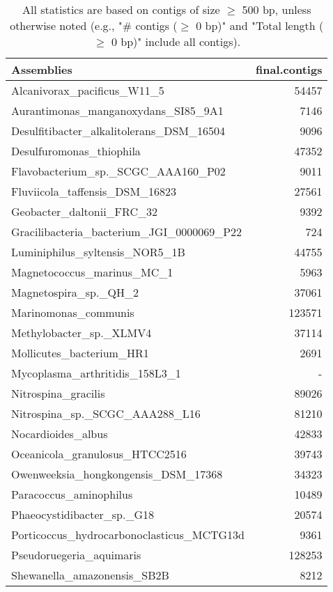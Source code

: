 \documentclass[12pt,a4paper]{article}
\begin{document}
\begin{table}[ht]
\begin{center}
\caption{All statistics are based on contigs of size $\geq$ 500 bp, unless otherwise noted (e.g., "\# contigs ($\geq$ 0 bp)" and "Total length ($\geq$ 0 bp)" include all contigs).}
\begin{tabular}{|l*{1}{|r}|}
\hline
Assemblies & final.contigs \\ \hline
Alcanivorax\_pacificus\_W11\_5 & 54457 \\ \hline
Aurantimonas\_manganoxydans\_SI85\_9A1 & 7146 \\ \hline
Desulfitibacter\_alkalitolerans\_DSM\_16504 & 9096 \\ \hline
Desulfuromonas\_thiophila & 47352 \\ \hline
Flavobacterium\_sp.\_SCGC\_AAA160\_P02 & 9011 \\ \hline
Fluviicola\_taffensis\_DSM\_16823 & 27561 \\ \hline
Geobacter\_daltonii\_FRC\_32 & 9392 \\ \hline
Gracilibacteria\_bacterium\_JGI\_0000069\_P22 & 724 \\ \hline
Luminiphilus\_syltensis\_NOR5\_1B & 44755 \\ \hline
Magnetococcus\_marinus\_MC\_1 & 5963 \\ \hline
Magnetospira\_sp.\_QH\_2 & 37061 \\ \hline
Marinomonas\_communis & 123571 \\ \hline
Methylobacter\_sp.\_XLMV4 & 37114 \\ \hline
Mollicutes\_bacterium\_HR1 & 2691 \\ \hline
Mycoplasma\_arthritidis\_158L3\_1 & - \\ \hline
Nitrospina\_gracilis & 89026 \\ \hline
Nitrospina\_sp.\_SCGC\_AAA288\_L16 & 81210 \\ \hline
Nocardioides\_albus & 42833 \\ \hline
Oceanicola\_granulosus\_HTCC2516 & 39743 \\ \hline
Owenweeksia\_hongkongensis\_DSM\_17368 & 34323 \\ \hline
Paracoccus\_aminophilus & 10489 \\ \hline
Phaeocystidibacter\_sp.\_G18 & 20574 \\ \hline
Porticoccus\_hydrocarbonoclasticus\_MCTG13d & 9361 \\ \hline
Pseudoruegeria\_aquimaris & 128253 \\ \hline
Shewanella\_amazonensis\_SB2B & 8212 \\ \hline

\end{tabular}
\end{center}
\end{table}
\end{document}
